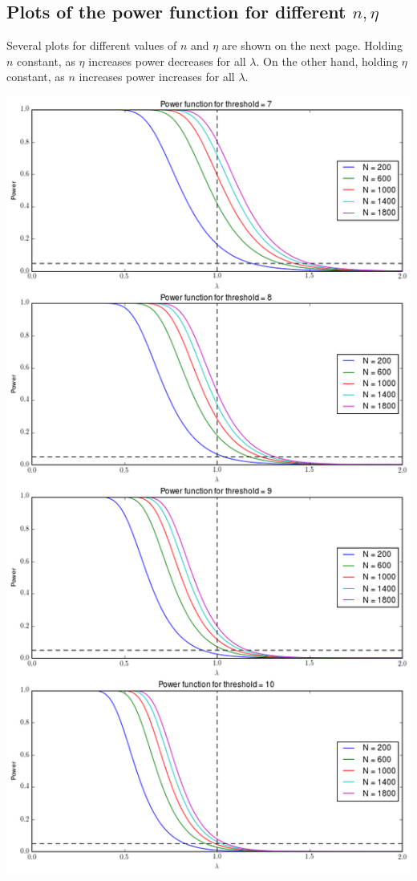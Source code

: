 \documentclass[paper=a4, fontsize=11pt]{scrartcl} %
\numberwithin{equation}{section} %
\numberwithin{figure}{section} %
\numberwithin{table}{section} %
\begin{document}
\subsection{Plots of the power function for different $n, \eta$}

Several plots for different values of $n$ and $\eta$ are shown on the next page. Holding $n$ constant, as $\eta$ increases power decreases for all $\lambda$. On the other hand, holding $\eta$ constant, as $n$ increases power increases for all $\lambda$. 
\begin{center}
\includegraphics[scale=0.5]{Q2c_fig} 
\end{center}
\end{document}
